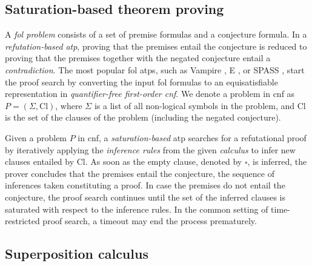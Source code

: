 

\subsection{Saturation-based theorem proving}

A \emph{\acrfull{fol} problem} consists of a set of premise formulas and a conjecture formula.
In a \emph{refutation-based} \emph{\acrfull{atp}},
proving that the premises entail the conjecture
is reduced to proving that the premises together with the negated conjecture entail a \emph{contradiction}.
The most popular \gls{fol} \glspl{atp}, such as Vampire \cite{10.1007/978-3-642-39799-8_1}, E \cite{10.1007/978-3-030-29436-6_29}, or SPASS \cite{},
start the proof search by converting the input \gls{fol} formulas to an equisatisfiable representation in \emph{quantifier-free first-order \gls{cnf}}.\cite{Harrison2009}
We denote a problem in \gls{cnf} as $P = (\Sigma, \mathrm{Cl})$,
where $\Sigma$ is a list of all non-logical symbols in the problem,
and $\mathrm{Cl}$ is the set of the clauses of the problem (including the negated conjecture).

Given a problem $P$ in \gls{cnf},
a \emph{saturation-based} \gls{atp} searches for a refutational proof
by iteratively applying the \emph{inference rules} from the given \emph{calculus}
to infer new clauses entailed by $\mathrm{Cl}$.
As soon as the empty clause, denoted by $\square$, is inferred,
the prover concludes that the premises entail the conjecture,
the sequence of inferences taken constituting a proof.
In case the premises do not entail the conjecture,
the proof search continues until
the set of the inferred clauses is saturated with respect to the inference rules.
In the common setting of time-restricted proof search, a timeout may end the process prematurely.



\subsection{Superposition calculus}


